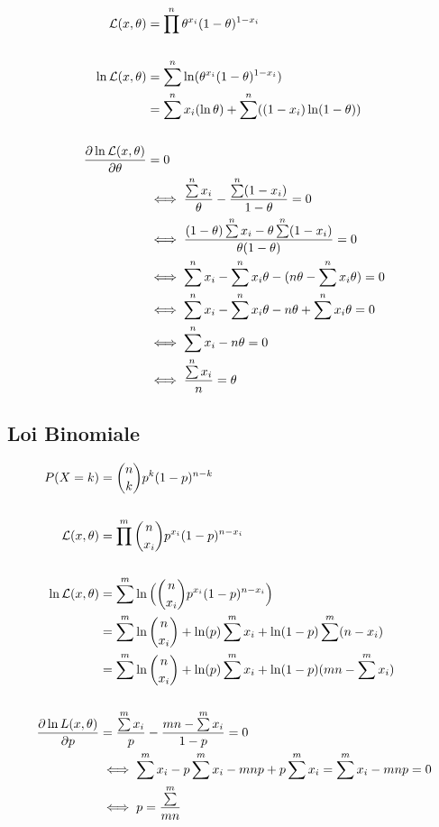 \documentclass{article}
\begin{document}
\begin{align*}
    \likelihood(x, \theta) &= \prod\limits^n \theta^{x_i}(1 - \theta)^{1 - x_i} \\ \\
    \ln \likelihood(x, \theta) &= \sum\limits^n \ln(\theta^{x_i}(1 - \theta)^{1 - x_i}) \\
    &= \sum\limits^n x_i (\ln\theta) + \sum\limits^n ((1-x_i) \ln(1-\theta)) \\ \\
    \frac{\partial \ln \likelihood(x, \theta)}{\partial \theta} &= 0 \\
    &\iff \frac{\sum\limits^n x_i}{\theta} - \frac{\sum\limits^n (1-x_i)}{1 - \theta} = 0 \\
    &\iff \frac{(1 - \theta) \sum\limits^n x_i - \theta \sum\limits^n (1 - x_i)}{\theta (1 - \theta)} = 0 \\
    &\iff \sum\limits^n x_i - \sum\limits^n x_i \theta - (n\theta - \sum\limits^n x_i\theta) = 0 \\
    &\iff \sum\limits^n x_i - \sum\limits^n x_i \theta -  n\theta + \sum\limits^n x_i\theta  = 0 \\
    &\iff \sum\limits^n x_i - n\theta = 0 \\
    &\iff \frac{\sum\limits^n x_i}{n} = \theta
\end{align*}

\subsection{Loi Binomiale}

\begin{align*}
    P(X=k) &= \dbinom{n}{k}p^k(1-p)^{n-k} \\
    \\
    {\cal L}(x, \theta) &= \prod\limits^m \dbinom{n}{x_i}p^{x_i}(1-p)^{n-x_i} \\
    \\
    \ln {\cal L}(x, \theta) &= \sum\limits^m \ln \Big( \dbinom{n}{x_i}p^{x_i}(1-p)^{n-x_i} \Big) \\
    &= \sum\limits^m \ln \dbinom{n}{x_i} + \ln(p) \sum\limits^m x_i + \ln(1-p)\sum\limits^m(n-x_i) \\
    &= \sum\limits^m \ln \dbinom{n}{x_i} + \ln(p) \sum\limits^m x_i + \ln(1-p)(mn - \sum\limits^m x_i) \\
    \\
    \frac{\partial \ln L(x, \theta)}{\partial p} &= \frac{\sum\limits^m x_i}{p} - \frac{mn - \sum\limits^m x_i}{1 - p} = 0 \\
    &\iff \sum\limits^m x_i - p \sum\limits^m x_i - mnp + p \sum\limits^m x_i = \sum\limits^m x_i - mnp = 0 \\
    &\iff p = \frac{\sum\limits^m}{mn}
\end{align*}
\end{document}
